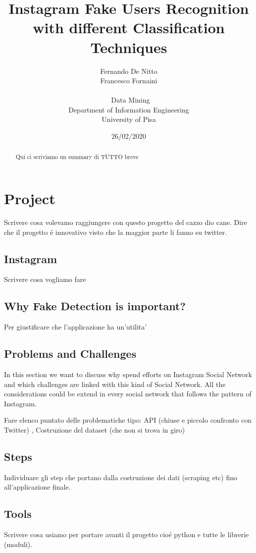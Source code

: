 \documentclass{article}
\title{Instagram Fake Users Recognition with different Classification Techniques}
\date{26/02/2020}
\author{Fernando De Nitto\\Francesco Fornaini\\\\\ Data Mining\\ Department of Information Engineering\\ University of Pisa\\}
\begin{document}
\maketitle


\begin{abstract} 
	Qui ci scriviamo un summary di TUTTO breve
\end{abstract}


\section{Project}
Scrivere cosa volevamo raggiungere con questo progetto del cazzo dio cane.
Dire che il progetto é innovativo visto che la maggior parte li fanno su twitter.

\subsection{Instagram}
Scrivere cosa vogliamo fare

\subsection{Why Fake Detection is important?}
Per giustificare che l'applicazione ha un'utilita'


\subsection{Problems and Challenges}
In this section we want to discuss why spend efforts on Instagram Social Network and which challenges are linked with this kind of Social Network. All the considerations could be extend in every social network that follows the pattern of Instagram.

Fare elenco puntato delle problematiche tipo: API (chiuse e piccolo confronto con Twitter) , Costruzione del dataset (che non si trova in giro) 

\subsection{Steps}
Individuare gli step che portano dalla costruzione dei dati (scraping etc) fino all'applicazione finale.

\subsection{Tools}
Scrivere cosa usiamo per portare avanti il progetto cioé python e tutte le librerie (moduli).
\end{document}
